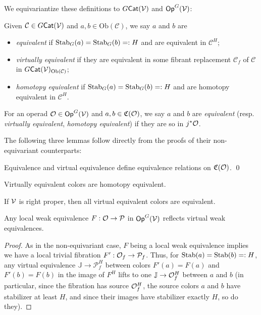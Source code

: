 \documentclass[psamsfonts,onesided,10pt,letterpaper]{amsart}%
\renewcommand{\C}{\ensuremath{\mathfrak{C}}}
\newcommand{\J}{\ensuremath{\mathbb{J}}}
\renewcommand{\1}{\ensuremath{\mathbb{id}}}
\renewcommand{\P}{\ensuremath{\mathcal{P}}}
\begin{document}
We equivariantize these definitions to $G\mathsf{Cat}(\mathcal V)$ and $\mathsf{Op}^G(\mathcal V)$:
\begin{definition}
  Given $\mathcal{C}\in G\mathsf{Cat}(\mathcal V)$ and $a,b\in \mathrm{Ob}(\mathcal{C})$, we say $a$ and $b$ are
\begin{itemize}
\item {\em equivalent} if $\mathrm{Stab}_G(a) = \mathrm{Stab}_G(b) =: H$ and are equivalent in $\mathcal{C}^H$;
\item {\em virtually equivalent} if they are equivalent in some fibrant replacement $\mathcal{C}_f$ of $\mathcal{C}$ in $G\mathsf{Cat}(\mathcal V)_{\mathrm{Ob}(\mathcal{C})}$;
\item {\em homotopy equivalent} if $\mathrm{Stab}_G(a) = \mathrm{Stab}_G(b) =: H$ and are homotopy equivalent in $\mathcal{C}^H$. 
\end{itemize}
For an operad $\mathcal{O}\in \mathsf{Op}^G(\mathcal V)$ and $a,b\in \C(\O)$, we say $a$ and $b$ are {\em equivalent} (resp. {\em virtually equivalent}, {\em homotopy equivalent}) if they are so in $j^*\mathcal{O}$. 
\end{definition}

The following three lemmas follow directly from the proofs of their non-equivariant counterparts:
\begin{lemma}
  Equivalence and virtual equivalence define equivalence relations on $\C(\O)$. \qed
\end{lemma}
\begin{lemma}
  Virtually equivalent colors are homotopy equivalent. 
\end{lemma}
\begin{lemma}
  If $\mathcal V$ is right proper, then all virtual equivalent colors are equivalent. 
\end{lemma}

\begin{lemma}
  Any local weak equivalence $F: \O\to \P$ in $\mathsf{Op}^G(\mathcal V)$ reflects virtual weak equivalences.
\end{lemma}
\begin{proof}
  As in the non-equivariant case, $F$ being a local weak equivalence implies we have a local trivial fibration $F': \O_f\to \P_f$. Thus, for $\mathrm{Stab}(a) = \mathrm{Stab}(b) =: H$, any virtual equivalence $\J \to \P_f^H$ between colors $F'(a) = F(a)$ and $F'(b) = F(b)$ in the image of $F^H$ lifts to one $\J\to \O_f^H$ between $a$ and $b$ (in particular, since the fibration has source $\mathcal{O}_f^H$, the source colors $a$ and $b$ have stabilizer at least $H$, and since their images have stabilizer exactly $H$, so do they). 
\end{proof}
\end{document}
